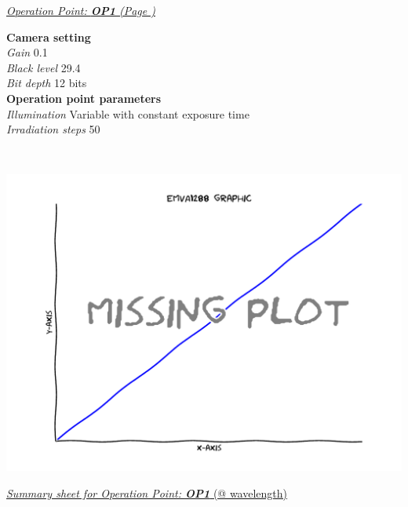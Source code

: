 \documentclass[a4paper,twoside,12pt,american,hidelinks]{article}
\begin{document}
	\underline{\textsl{Operation Point: \textbf{OP1} (Page \pageref{OP1})}}

 	\begin{minipage}[t]{0.975\linewidth}
\begin{multicols}{2}
\textbf{Camera setting} \hfill
\\[1mm]
\textsl{Gain} \hfill 0.1
\\[1mm]
\textsl{Black level} \hfill 29.4
\\[1mm]
\textsl{Bit depth} \hfill 12 bits
\\[1mm]
\textbf{Operation point parameters}
\\[1mm]
\textsl{Illumination} \hfill Variable with constant exposure time
\\[1mm]
\textsl{Irradiation steps} \hfill 50
\\[1mm]
\end{multicols}
\end{minipage}
\\[5mm]


\vfill
\begin{center}
\includegraphics[height=100mm,keepaspectratio]{files/missingplot.pdf}
\end{center}

 	\newpage
{}

\underline{\textsl{Summary sheet for Operation Point: \textbf{OP1}\label{OP1}} (@ wavelength)}
\end{document}
